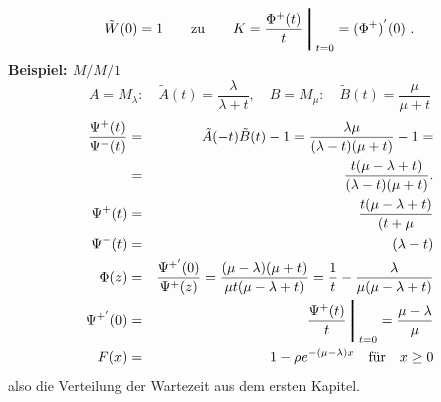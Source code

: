 \begin{displaymath}
\tilde W (0) = 1 \qquad \mbox{zu} \qquad
K = \frac{\Phi^{+}(t)}{t} \Bigg \bracevert_{t=0} = (\Phi^{+})^{'}(0) ~.
\end{displaymath}
{\bf Beispiel: $M/M/1$}
\begin{displaymath}
A = M_{\lambda}: \quad \tilde A(t) = \frac{\lambda}{\lambda + t}, \quad
B = M_{\mu}: \quad \tilde B(t) =\frac{\mu}{\mu +t}
\end{displaymath}
\begin{eqnarray*}
\frac{\Psi^{+}(t)}{\Psi^{-}(t)} &=& \tilde A(-t) \tilde B(t)-1 =
\frac{\lambda \mu}{(\lambda - t)(\mu + t)} - 1 = \\
 &=& \frac{t(\mu - \lambda + t)}{(\lambda - t)(\mu + t)}. \\
\Psi^{+}(t) &=& \frac{t(\mu -\lambda + t)}{(t + \mu} \\
\Psi^{-}(t) &=& (\lambda - t) \\
\Phi (z) &=& \frac{\Psi^{+'}(0)}{\Psi^{+}(z)} =
\frac{(\mu - \lambda)(\mu +t)}{\mu t(\mu - \lambda + t)} =
\frac{1}{t} - \frac{\lambda}{\mu(\mu - \lambda + t)} \\
\Psi^{+'}(0) &=& \frac{\Psi^{+}(t)}{t} \Bigg \bracevert_{t=0} =\frac{\mu -
\lambda}{\mu} \\
F(x) &=& 1 - \rho e^{-(\mu - \lambda)x} \quad \mbox{für} \quad x \geq 0
\end{eqnarray*}
also die Verteilung der Wartezeit aus dem ersten Kapitel.
